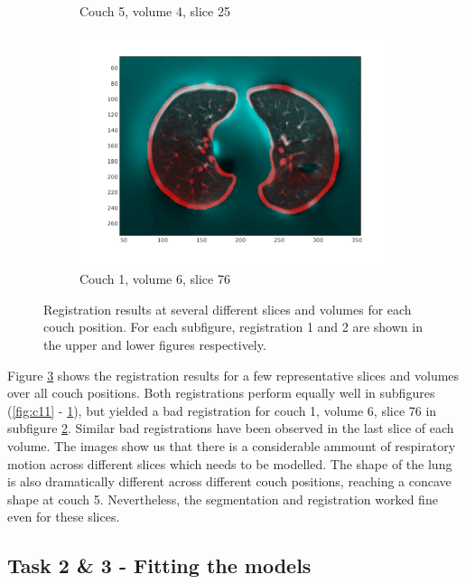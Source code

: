 \documentclass[11pt,a4paper,oneside]{report}
\begin{document}
\begin{figure}[H]
\begin{subfigure}[b]{0.3\textwidth}
	  \caption{Couch 5, volume 4, slice 25}
	  \label{fig:c22}
  \end{subfigure}
  \begin{subfigure}[b]{0.3\textwidth}
	  \includegraphics[width=\textwidth, trim=20 20 20 20]{figures/reg2/reg1_6_76.png}
	  \caption{Couch 1, volume 6, slice 76}
	  \label{fig:c23}
  \end{subfigure}
  \caption{Registration results at several different slices and volumes for each couch position. For each subfigure, registration 1 and 2 are shown in the upper and lower figures respectively.}
  \label{fig:c1vis}
\end{figure}


Figure \ref{fig:c1vis} shows the registration results for a few representative slices and volumes over all couch positions. Both registrations perform equally well in subfigures (\ref{fig:c11} - \ref{fig:c22}), but yielded a bad registration for couch 1, volume 6, slice 76 in subfigure \ref{fig:c23}. Similar bad registrations have been observed in the last slice of each volume. The images show us that there is a considerable ammount of respiratory motion across different slices which needs to be modelled. The shape of the lung is also dramatically different across different couch positions, reaching a concave shape at couch 5. Nevertheless, the segmentation and registration worked fine even for these slices.

\subsection*{Task 2 \& 3 - Fitting the models}
\end{document}
